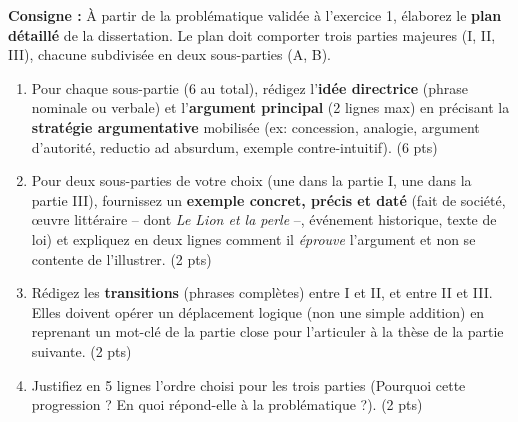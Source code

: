 \documentclass[11pt]{article}
\begin{document}
\begin{exercice}
\textbf{Consigne :} À partir de la problématique validée à l'exercice 1, élaborez le \textbf{plan détaillé} de la dissertation. Le plan doit comporter trois parties majeures (I, II, III), chacune subdivisée en deux sous-parties (A, B).

\begin{enumerate}
    \item Pour chaque sous-partie (6 au total), rédigez l'\textbf{idée directrice} (phrase nominale ou verbale) et l'\textbf{argument principal} (2 lignes max) en précisant la \textbf{stratégie argumentative} mobilisée (ex: concession, analogie, argument d'autorité, reductio ad absurdum, exemple contre-intuitif). (6 pts)
    \item Pour deux sous-parties de votre choix (une dans la partie I, une dans la partie III), fournissez un \textbf{exemple concret, précis et daté} (fait de société, œuvre littéraire -- dont \textit{Le Lion et la perle} --, événement historique, texte de loi) et expliquez en deux lignes comment il \textit{éprouve} l'argument et non se contente de l'illustrer. (2 pts)
    \item Rédigez les \textbf{transitions} (phrases complètes) entre I et II, et entre II et III. Elles doivent opérer un déplacement logique (non une simple addition) en reprenant un mot-clé de la partie close pour l'articuler à la thèse de la partie suivante. (2 pts)
    \item Justifiez en 5 lignes l'ordre choisi pour les trois parties (Pourquoi cette progression ? En quoi répond-elle à la problématique ?). (2 pts)
\end{enumerate}
\end{exercice}
\end{document}
